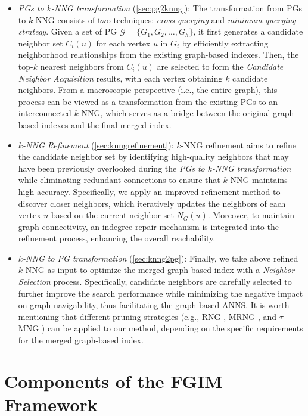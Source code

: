 \documentclass[acmsmall]{acmart}
\theoremstyle{remark}
\theoremstyle{definition}
\begin{document}
\begin{itemize}[leftmargin=1em,itemsep=0pt]
	\item \textit{PGs to $k$-NNG transformation} (\textsection\ref{sec:pg2knng}): The transformation from PGs to $k$-NNG consists of two techniques: \textit{cross-querying} and \textit{minimum querying strategy}. Given a set of PG $\mathcal{G} = \{G_1, G_2, \ldots, G_h\}$, it first generates a candidate neighbor set $C_{i}(u)$ for each vertex $u$ in $G_i$ by efficiently extracting neighborhood relationships from the existing graph-based indexes. Then, the top-$k$ nearest neighbors from $C_{i}(u)$ are selected to form the \textit{Candidate Neighbor Acquisition} results, with each vertex obtaining $k$ candidate neighbors. From a macroscopic perspective (i.e., the entire graph), this process can be viewed as a transformation from the existing PGs to an interconnected $k$-NNG, which serves as a bridge between the original graph-based indexes and the final merged index.
	\item \textit{$k$-NNG Refinement} (\textsection\ref{sec:knngrefinement}): $k$-NNG refinement aims to refine the candidate neighbor set by identifying high-quality neighbors that may have been previously overlooked during the \textit{PGs to $k$-NNG transformation} while eliminating redundant connections to ensure that $k$-NNG maintains high accuracy. Specifically, we apply an improved refinement method to discover closer neighbors, which iteratively updates the neighbors of each vertex $u$ based on the current neighbor set $N_G(u)$. Moreover, to maintain graph connectivity, an indegree repair mechanism is integrated into the refinement process, enhancing the overall reachability.
	\item \textit{$k$-NNG to PG transformation} (\textsection\ref{sec:knng2pg}): Finally, we take above refined $k$-NNG as input to optimize the merged graph-based index with a \textit{Neighbor Selection} process. Specifically, candidate neighbors are carefully selected to further improve the search performance while minimizing the negative impact on graph navigability, thus facilitating the graph-based ANNS. It is worth mentioning that different pruning strategies (e.g., RNG \cite{toussaint1980relative}, MRNG \cite{fu2017fast}, and $\tau$-MNG \cite{peng2023efficient}) can be applied to our method, depending on the specific requirements for the merged graph-based index.
\end{itemize} 

\section{Components of the FGIM Framework}
\label{sec:implementation}
\end{document}
